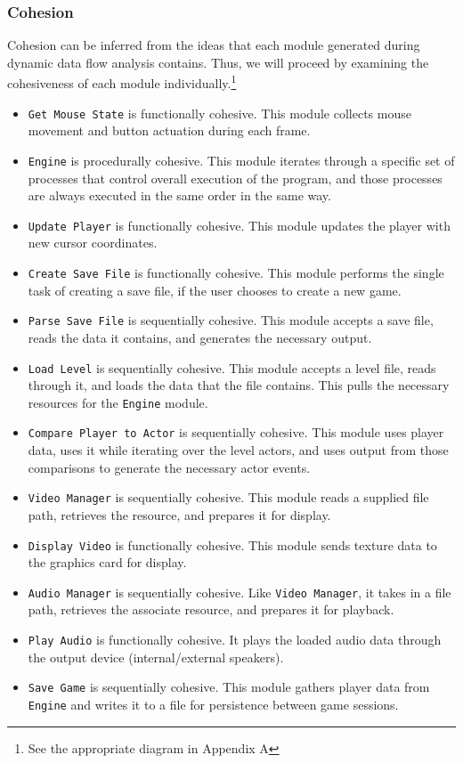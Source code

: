 \documentclass{article}
\begin{document}
		\subsubsection{Cohesion}
			Cohesion can be inferred from the ideas that each module generated during dynamic data flow analysis contains. Thus, we will proceed by examining the cohesiveness of each module individually.\footnote{See the appropriate diagram in Appendix A}
			\begin{itemize}
				\item \texttt{Get Mouse State} is functionally cohesive. This module collects mouse movement and button actuation during each frame. 
				\item \texttt{Engine} is procedurally cohesive. This module iterates through a specific set of processes that control overall execution of the program, and those processes are always executed in the same order in the same way. 
				\item \texttt{Update Player} is functionally cohesive. This module updates the player with new cursor coordinates. 
				\item \texttt{Create Save File} is functionally cohesive. This module performs the single task of creating a save file, if the user chooses to create a new game. 
				\item \texttt{Parse Save File} is sequentially cohesive. This module accepts a save file, reads the data it contains, and generates the necessary output. 
				\item \texttt{Load Level} is sequentially cohesive. This module accepts a level file, reads through it, and loads the data that the file contains. This pulls the necessary resources for the \texttt{Engine} module. 
				\item \texttt{Compare Player to Actor} is sequentially cohesive. This module uses player data, uses it while iterating over the level actors, and uses output from those comparisons to generate the necessary actor events. 
				\item \texttt{Video Manager} is sequentially cohesive. This module reads a supplied file path, retrieves the resource, and prepares it for display. 
				\item \texttt{Display Video} is functionally cohesive. This module sends texture data to the graphics card for display. 
				\item \texttt{Audio Manager} is sequentially cohesive. Like \texttt{Video Manager}, it takes in a file path, retrieves the associate resource, and prepares it for playback. 
				\item \texttt{Play Audio} is functionally cohesive. It plays the loaded audio data through the output device (internal/external speakers). 
				\item \texttt{Save Game} is sequentially cohesive. This module gathers player data from \texttt{Engine} and writes it to a file for persistence between game sessions. 
			\end{itemize}
\end{document}
